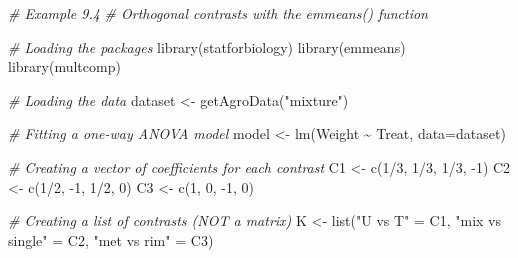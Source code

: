 \documentclass[
  12pt,
]{book}
\newenvironment{Shaded}{\begin{snugshade}}{\end{snugshade}}
\newcommand{\AttributeTok}[1]{\textcolor[rgb]{0.77,0.63,0.00}{#1}}
\newcommand{\CommentTok}[1]{\textcolor[rgb]{0.56,0.35,0.01}{\textit{#1}}}
\newcommand{\DecValTok}[1]{\textcolor[rgb]{0.00,0.00,0.81}{#1}}
\newcommand{\FunctionTok}[1]{\textcolor[rgb]{0.00,0.00,0.00}{#1}}
\newcommand{\NormalTok}[1]{#1}
\newcommand{\OtherTok}[1]{\textcolor[rgb]{0.56,0.35,0.01}{#1}}
\newcommand{\SpecialCharTok}[1]{\textcolor[rgb]{0.00,0.00,0.00}{#1}}
\newcommand{\StringTok}[1]{\textcolor[rgb]{0.31,0.60,0.02}{#1}}
\begin{document}
\begin{Shaded}
\begin{Highlighting}[]
\CommentTok{\# Example 9.4}
\CommentTok{\# Orthogonal contrasts with the \textquotesingle{}emmeans()\textquotesingle{} function}

\CommentTok{\# Loading the packages}
\FunctionTok{library}\NormalTok{(statforbiology)}
\FunctionTok{library}\NormalTok{(emmeans)}
\FunctionTok{library}\NormalTok{(multcomp)}

\CommentTok{\# Loading the data}
\NormalTok{dataset }\OtherTok{\textless{}{-}} \FunctionTok{getAgroData}\NormalTok{(}\StringTok{"mixture"}\NormalTok{)}

\CommentTok{\# Fitting a one{-}way ANOVA model}
\NormalTok{model }\OtherTok{\textless{}{-}} \FunctionTok{lm}\NormalTok{(Weight }\SpecialCharTok{\textasciitilde{}}\NormalTok{ Treat, }\AttributeTok{data=}\NormalTok{dataset)}

\CommentTok{\# Creating a vector of coefficients for each contrast}
\NormalTok{C1 }\OtherTok{\textless{}{-}} \FunctionTok{c}\NormalTok{(}\DecValTok{1}\SpecialCharTok{/}\DecValTok{3}\NormalTok{, }\DecValTok{1}\SpecialCharTok{/}\DecValTok{3}\NormalTok{, }\DecValTok{1}\SpecialCharTok{/}\DecValTok{3}\NormalTok{, }\SpecialCharTok{{-}}\DecValTok{1}\NormalTok{)}
\NormalTok{C2 }\OtherTok{\textless{}{-}} \FunctionTok{c}\NormalTok{(}\DecValTok{1}\SpecialCharTok{/}\DecValTok{2}\NormalTok{, }\SpecialCharTok{{-}}\DecValTok{1}\NormalTok{, }\DecValTok{1}\SpecialCharTok{/}\DecValTok{2}\NormalTok{, }\DecValTok{0}\NormalTok{)}
\NormalTok{C3 }\OtherTok{\textless{}{-}} \FunctionTok{c}\NormalTok{(}\DecValTok{1}\NormalTok{, }\DecValTok{0}\NormalTok{, }\SpecialCharTok{{-}}\DecValTok{1}\NormalTok{, }\DecValTok{0}\NormalTok{)}

\CommentTok{\# Creating a list of contrasts (NOT a matrix)}
\NormalTok{K }\OtherTok{\textless{}{-}} \FunctionTok{list}\NormalTok{(}\StringTok{"U vs T"} \OtherTok{=}\NormalTok{ C1, }
          \StringTok{"mix vs single"} \OtherTok{=}\NormalTok{ C2,}
          \StringTok{"met vs rim"} \OtherTok{=}\NormalTok{ C3)}


\end{Highlighting}
\end{Shaded}
\end{document}
